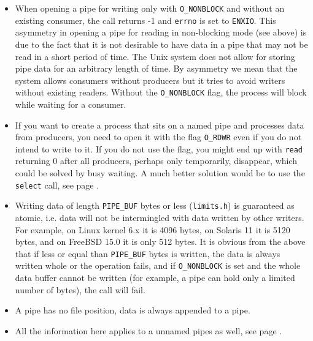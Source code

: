 \begin{itemize}
\item When opening a pipe for writing only with \texttt{O\_NONBLOCK} and without
an existing consumer, the call returns -1 and \texttt{errno} is set to
\texttt{ENXIO}.  This asymmetry in opening a pipe for reading in non-blocking
mode (see above) is due to the fact that it is not desirable to have data in a
pipe that may not be read in a short period of time.  The Unix system does not
allow for storing pipe data for an arbitrary length of time.  By asymmetry we
mean that the system allows consumers without producers but it tries to avoid
writers without existing readers.  Without the \texttt{O\_NONBLOCK} flag, the
process will block while waiting for a consumer.
\item  If you want to create a process that sits on a named pipe and processes
data from producers, you need to open it with the flag \texttt{O\_RDWR} even
if you do not intend to write to it.  If you do not use the flag, you might end
up with \texttt{read} returning 0 after all producers, perhaps only temporarily,
disappear, which could be solved by busy waiting.  A much better solution would
be to use the \texttt{select} call, see page \pageref{SELECT}.
\item Writing data of length \texttt{PIPE\_BUF} bytes or less
(\texttt{limits.h}) is guaranteed as atomic, i.e. data will not be intermingled
with data written by other writers.  For example, on Linux kernel 6.x it is 4096
bytes, on Solaris 11 it is 5120 bytes, and on FreeBSD 15.0 it is only 512 bytes.
It is obvious from the above that if less or equal than \texttt{PIPE\_BUF}
bytes is written, the data is always written whole or the operation fails,
and if \texttt{O\_NONBLOCK} is set and the whole data buffer cannot be written
(for example, a pipe can hold only a limited number of bytes), the call will fail.
\item A pipe has no file position, data is always appended to a pipe.
\item All the information here applies to a unnamed pipes as well, see page
\pageref{PIPE}.
\end{itemize}



